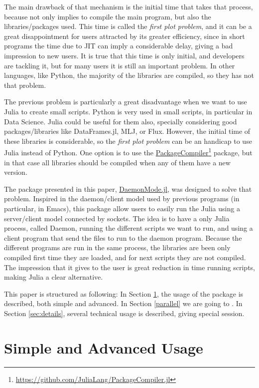\documentclass{juliacon}
\begin{document}
The main drawback of that mechanism is the initial time that takes that process,
because not only implies to compile the main program, but also the
libraries/packages used. This time is called the \textit{first plot problem},
and it can be a great disappointment for users attracted by its greater
efficiency, since in short programs the time due to JIT can imply a considerable
delay, giving a bad impression to new users. It is true that this time is only
initial, and developers are tackling it, but for many users it is still an important problem.
In other languages, like Python, the majority of the libraries are compiled, so
they has not that problem.

The previous problem is particularly a great disadvantage when we want to use
Julia to create small scripts. Python is very used in small scripts, in
particular in Data Science. Julia could be useful for them also, specially
considering good packages/libraries like DataFrames.jl, MLJ, or Flux. However,
the initial time of these libraries is considerable, so the \textit{first plot
  problem} can be an handicap to use Julia instead of Python. One option is to
use the
\href{https://github.com/JuliaLang/PackageCompiler.jl}{PackageCompiler}\footnote{\url{https://github.com/JuliaLang/PackageCompiler.jl}}
package, but in that case all libraries should be compiled when any of them have
a new version.

The package presented in this paper,
\href{https://github.com/dmolina/DaemonMode.jl/}{DaemonMode.jl}, was designed to
solve that problem. Inspired in the daemon/client model used by previous
programs (in particular, in Emacs), this package allow users to easily run the
Julia using a server/client model connected by sockets. The idea is to have a
only Julia process, called Daemon, running the different scripts we want to run,
and using a client program that send the files to run to the daemon program.
Because the different programs are run in the same process, the libraries are
been only compiled first time they are loaded, and for next scripts they are not
compiled. The impression that it gives to the user is great reduction in time
running scripts, making Julia a clear alternative.

This paper is structured as following: In Section \ref{sec:usage}, the usage of
the package is described, both simple and advanced. In Section \ref{parallel} we
are going to . In Section \ref{sec:details}, several technical usage is
described, giving special session. 

\section{Simple and Advanced Usage}
\label{sec:usage}
\end{document}
